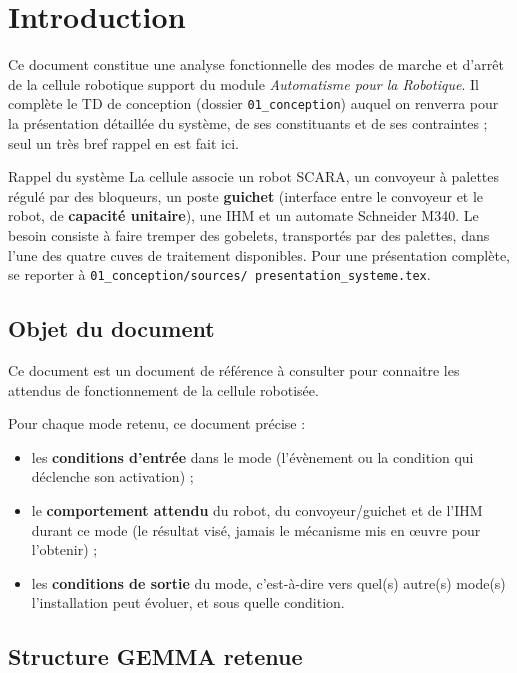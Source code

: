 \section{Introduction}

Ce document constitue une analyse fonctionnelle des modes de marche et
d'arrêt de la cellule robotique support du module \emph{Automatisme pour la
Robotique}. Il complète le TD de conception (dossier \texttt{01\_conception})
auquel on renverra pour la présentation détaillée du système, de ses
constituants et de ses contraintes ; seul un très bref rappel en est fait
ici.

\begin{UPSTIinfor}{Rappel du système}
La cellule associe un robot SCARA, un convoyeur à palettes régulé par des
bloqueurs, un poste \textbf{guichet} (interface entre le convoyeur et le
robot, de \textbf{capacité unitaire}), une IHM et un automate Schneider
M340. Le besoin consiste à faire tremper des gobelets, transportés par des
palettes, dans l'une des quatre cuves de traitement disponibles. Pour une
présentation complète, se reporter à \texttt{01\_conception/sources/\allowbreak
presentation\_systeme.tex}.
\end{UPSTIinfor}

\subsection{Objet du document}

Ce document est un document de référence à consulter pour connaitre les attendus 
de fonctionnement de la cellule robotisée.

Pour chaque mode retenu, ce document précise :
\begin{itemize}
    \item les \textbf{conditions d'entrée} dans le mode (l'évènement ou la
    condition qui déclenche son activation) ;
    \item le \textbf{comportement attendu} du robot, du convoyeur/guichet
    et de l'IHM durant ce mode (le résultat visé, jamais le mécanisme mis
    en \oe uvre pour l'obtenir) ;
    \item les \textbf{conditions de sortie} du mode, c'est-à-dire vers
    quel(s) autre(s) mode(s) l'installation peut évoluer, et sous quelle
    condition.
\end{itemize}

\subsection{Structure GEMMA retenue}


